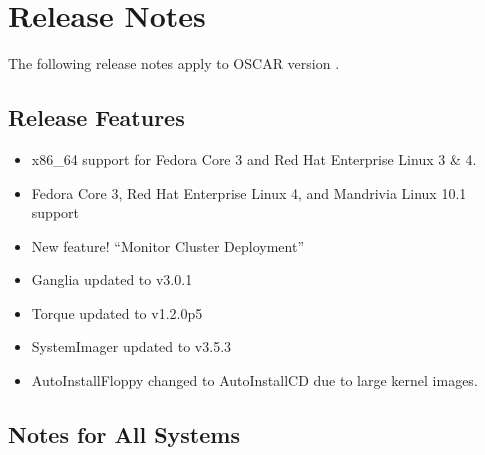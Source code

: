 %
%
%
%

\section{Release Notes}
\label{sec:release-notes}

The following release notes apply to OSCAR version \oscarversion.
\subsection{Release Features}
\label{subsec:release-features}

\begin{itemize}

\item x86\_64 support for Fedora Core 3 and Red Hat Enterprise Linux 3 \& 4.
\item Fedora Core 3, Red Hat Enterprise Linux 4, and 
      Mandrivia Linux 10.1 support
\item New feature! ``Monitor Cluster Deployment''
\item Ganglia updated to v3.0.1
\item Torque updated to v1.2.0p5
\item SystemImager updated to v3.5.3
\item AutoInstallFloppy changed to AutoInstallCD due to large kernel images.

\end{itemize}

\subsection{Notes for All Systems}
\label{subsec:release-notes}

